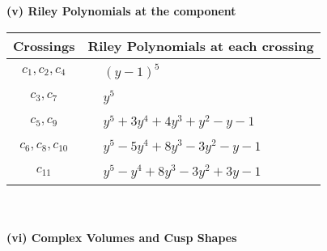 \documentclass[1p]{elsarticle_modified}
\theoremstyle{definition}
\begin{document}
\newpage\renewcommand{\arraystretch}{1}
\flushleft \textbf{(v) Riley Polynomials at the component}\newline \\
\begin{tabular}{m{50pt}|m{274pt}}
Crossings & \hspace{64pt}Riley Polynomials at each crossing \\
\hline $$\begin{aligned}c_{1},c_{2},c_{4}\end{aligned}$$&$\begin{aligned}
&(y-1)^5
\end{aligned}$\\
\hline $$\begin{aligned}c_{3},c_{7}\end{aligned}$$&$\begin{aligned}
&y^5
\end{aligned}$\\
\hline $$\begin{aligned}c_{5},c_{9}\end{aligned}$$&$\begin{aligned}
&y^5+3 y^4+4 y^3+y^2- y-1
\end{aligned}$\\
\hline $$\begin{aligned}c_{6},c_{8},c_{10}\end{aligned}$$&$\begin{aligned}
&y^5-5 y^4+8 y^3-3 y^2- y-1
\end{aligned}$\\
\hline $$\begin{aligned}c_{11}\end{aligned}$$&$\begin{aligned}
&y^5- y^4+8 y^3-3 y^2+3 y-1
\end{aligned}$\\
\hline
\end{tabular}\\~\\
\newpage\flushleft \textbf{(vi) Complex Volumes and Cusp Shapes}
\end{document}
